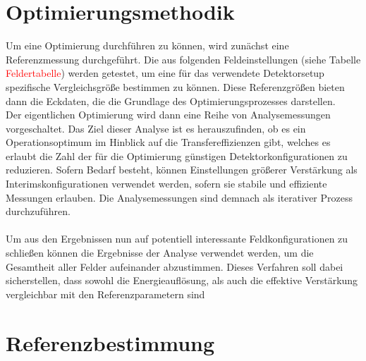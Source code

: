 	\section{Optimierungsmethodik}
	Um eine Optimierung durchführen zu können, wird zunächst eine Referenzmessung durchgeführt. Die aus \cite{ottnad} folgenden Feldeinstellungen (siehe Tabelle \textcolor{red}{Feldertabelle}) werden getestet, um eine für das verwendete Detektorsetup spezifische Vergleichsgröße bestimmen zu können. Diese Referenzgrößen bieten dann die Eckdaten, die die Grundlage des Optimierungsprozesses darstellen.\\
	Der eigentlichen Optimierung wird dann eine Reihe von Analysemessungen vorgeschaltet. Das Ziel dieser Analyse ist es herauszufinden, ob es ein Operationsoptimum im Hinblick auf die Transfereffizienzen gibt, welches es erlaubt die Zahl der für die Optimierung günstigen Detektorkonfigurationen zu reduzieren. Sofern Bedarf besteht, können Einstellungen größerer Verstärkung als Interimskonfigurationen verwendet werden, sofern sie stabile und effiziente Messungen erlauben. Die Analysemessungen sind demnach als iterativer Prozess durchzuführen.\\
	\\
	Um aus den Ergebnissen nun auf potentiell interessante Feldkonfigurationen zu schließen können die Ergebnisse der Analyse verwendet werden, um die Gesamtheit aller Felder aufeinander abzustimmen. Dieses Verfahren soll dabei sicherstellen, dass sowohl die Energieauflösung, als auch die effektive Verstärkung vergleichbar mit den Referenzparametern sind 
	
	\section{Referenzbestimmung}

